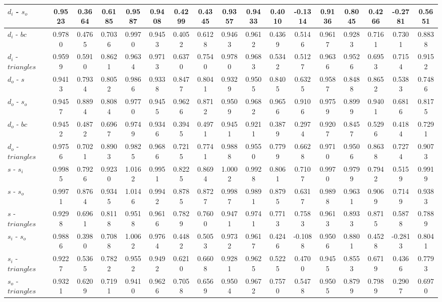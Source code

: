 \documentclass[%
 aip,
 jmp,%
 amsmath,amssymb,
 reprint,%
]{revtex4-1}
\begin{document}
\begin{table}
\begin{tabular}{|l|| c|c|c|c||  c|c|c|c||   c|c|c|c||   c|c|c|c|}
$d_i$ - $s_o$ & 0.9523 & 0.3664 & 0.6185 & 0.9587 & 0.9408 & 0.4299 & 0.4345 & 0.9357 & 0.9433 & 0.4010 & -0.1314 & 0.9136 & 0.8045 & 0.4266 & -0.2781 & 0.5651 \\ \hline
$d_i$ - $bc$ & 0.9780 & 0.4765 & 0.7036 & 0.9970 & 0.9453 & 0.4052 & 0.6128 & 0.9463 & 0.9612 & 0.4369 & 0.5146 & 0.9617 & 0.9283 & 0.7161 & 0.7301 & 0.8838 \\ \hline
$d_i$ - $triangles$ & 0.9599 & 0.5910 & 0.8621 & 0.9634 & 0.9713 & 0.6370 & 0.7540 & 0.9780 & 0.9683 & 0.5342 & 0.5127 & 0.9636 & 0.9526 & 0.6953 & 0.7154 & 0.9152 \\ \hline
$d_o$ - $s$ & 0.9413 & 0.7934 & 0.8052 & 0.9866 & 0.9338 & 0.8477 & 0.8041 & 0.9329 & 0.9505 & 0.8405 & 0.6325 & 0.9587 & 0.8488 & 0.8652 & 0.5383 & 0.7486 \\ \hline
$d_o$ - $s_o$ & 0.9457 & 0.8894 & 0.8084 & 0.9770 & 0.9455 & 0.9626 & 0.8712 & 0.9509 & 0.9682 & 0.9656 & 0.9106 & 0.9759 & 0.8999 & 0.9401 & 0.6816 & 0.8175 \\ \hline
$d_o$ - $bc$ & 0.9452 & 0.4872 & 0.6967 & 0.9749 & 0.9346 & 0.3945 & 0.4971 & 0.9451 & 0.9211 & 0.3879 & 0.2974 & 0.9207 & 0.8457 & 0.5296 & 0.4184 & 0.7291 \\ \hline
$d_o$ - $triangles$ & 0.9756 & 0.7021 & 0.8903 & 0.9825 & 0.9686 & 0.7215 & 0.7741 & 0.9888 & 0.9550 & 0.7799 & 0.6628 & 0.9710 & 0.9506 & 0.8638 & 0.7274 & 0.9073 \\ \hline
$s$ - $s_i$ & 0.9985 & 0.7926 & 0.9230 & 1.0162 & 0.9951 & 0.8225 & 0.8694 & 1.0002 & 0.9928 & 0.8061 & 0.7107 & 0.9970 & 0.9799 & 0.7942 & 0.5159 & 0.9919 \\ \hline
$s$ - $s_o$ & 0.9971 & 0.8764 & 0.9345 & 1.0146 & 0.9942 & 0.8785 & 0.8727 & 0.9987 & 0.9891 & 0.8795 & 0.6317 & 0.9898 & 0.9631 & 0.9069 & 0.7149 & 0.9383 \\ \hline
$s$ - $triangles$ & 0.9298 & 0.6961 & 0.8118 & 0.9518 & 0.9616 & 0.7829 & 0.7600 & 0.9471 & 0.9741 & 0.7713 & 0.7583 & 0.9613 & 0.8933 & 0.8715 & 0.5878 & 0.7889 \\ \hline
$s_i$ - $s_o$ & 0.9886 & 0.3980 & 0.7088 & 1.0062 & 0.9764 & 0.4482 & 0.5053 & 0.9732 & 0.9617 & 0.4246 & -0.1088 & 0.9506 & 0.8801 & 0.4528 & -0.2813 & 0.8041 \\ \hline
$s_i$ - $triangles$ & 0.9227 & 0.5365 & 0.7822 & 0.9552 & 0.9492 & 0.6210 & 0.6608 & 0.9281 & 0.9625 & 0.5225 & 0.4700 & 0.9455 & 0.8553 & 0.6719 & 0.4366 & 0.7793 \\ \hline
$s_o$ - $triangles$ & 0.9321 & 0.6209 & 0.7191 & 0.9410 & 0.9626 & 0.7058 & 0.6569 & 0.9504 & 0.9672 & 0.7570 & 0.5478 & 0.9505 & 0.8799 & 0.7989 & 0.2907 & 0.6970 \\ \hline

\end{tabular}
\end{table}
\end{document}
